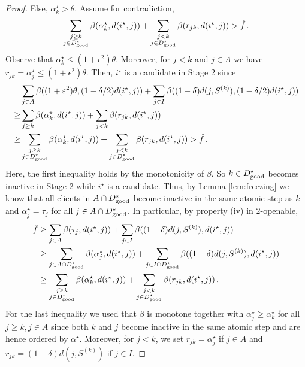 \begin{proof}
    Else, $\alpha_k^\star > \theta$.
    Assume for contradiction,
    \[
        \sum_{\substack{j \ge k\\ j \in D^\star_{\mathrm{good}}}} \beta(\alpha^\star_k, d(i^\star,j)) + \sum_{\substack{j < k\\ j \in D^\star_{\mathrm{good}}}} \beta(r_{jk}, d(i^\star,j)) >  \hat f\,.
    \]
    Observe that $\alpha^\star_k \leq (1+\epsilon^2)\theta$. Moreover, for $j < k$ and $j \in A$ we have $r_{jk} = \alpha^\star_j \leq (1+\epsilon^2)\theta$. Then, $i^\star$ is a candidate in Stage 2 since
    \begin{align*}
        & \sum_{j\in A}\beta((1+\varepsilon^2)\theta, (1- \delta/2)d(i^\star,j)) + \sum_{j\in I}\beta((1-\delta)d(j,S^{(k)}), (1-\delta/2)d(i^\star,j)) \\
        \ge & \sum_{j \ge k} \beta(\alpha^\star_k, d(i^\star,j)) + \sum_{j < k} \beta(r_{jk}, d(i^\star,j)) \\
        \ge & \sum_{\substack{j \ge k\\ j \in D^\star_{\mathrm{good}}}} \beta(\alpha^\star_k, d(i^\star,j)) + \sum_{\substack{j < k\\ j \in D^\star_{\mathrm{good}}}} \beta(r_{jk}, d(i^\star,j)) > \hat f\,.
    \end{align*}
    Here, the first inequality holds by the monotonicity of $\beta$.
    So $k \in D^\star_{\mathrm{good}}$ becomes inactive in Stage 2 while $i^\star$ is a candidate. Thus, by Lemma \ref{lem:freezing} we know that all clients in $A \cap D^\star_{\mathrm{good}}$ become inactive in the same atomic step as $k$ and $\alpha^\star_j = \tau_j$ for all $j \in A\cap D^\star_{\mathrm{good}}$. In particular, by property (iv) in $2$-openable,
    \begin{align*}
        \hat f & \ge \sum_{j \in A} \beta(\tau_j, d(i^\star,j)) + \sum_{j \in I} \beta((1-\delta)d(j, S^{(k)}), d(i^\star,j)) \\
        & \ge \sum_{j \in A \cap D^\star_{\mathrm{good}}} \beta(\alpha^\star_j, d(i^\star,j)) + \sum_{j \in I \cap D^\star_{\mathrm{good}}} \beta((1-\delta)d(j, S^{(k)}), d(i^\star,j)) \\
        & \ge \sum_{\substack{j \ge k\\ j \in D^\star_{\mathrm{good}}}} \beta(\alpha^\star_k, d(i^\star,j)) + \sum_{\substack{j < k\\ j \in D^\star_{\mathrm{good}}}} \beta(r_{jk}, d(i^\star,j))\,.
    \end{align*}
    For the last inequality we used that $\beta$ is monotone together with $\alpha^\star_j \ge \alpha^\star_k$ for all $j \ge k, j \in A$ since both $k$ and $j$ become inactive in the same atomic step and are hence ordered by $\alpha^\star$. Moreover, for $j < k$, we set $r_{jk} = \alpha^\star_j$ if $j \in A$ and $r_{jk} = (1-\delta)d(j,S^{(k)})$ if $j \in I$.

\end{proof}
